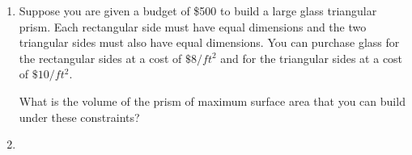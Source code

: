 \documentclass{article}
\begin{document}
\begin{enumerate}
\item
{}

Suppose you are given a budget of \$500 to build a large glass
triangular prism.  Each rectangular side must have equal dimensions 
and the two triangular sides must also have equal dimensions.  You
can purchase glass for the rectangular sides at a cost of $\$8/ft^2$ 
and for the triangular sides at a cost of $\$10/ft^2$.

What is the volume of the prism of maximum surface area that you can 
build under these constraints?

\item
{}


\end{enumerate}


\newpage
\end{document}
